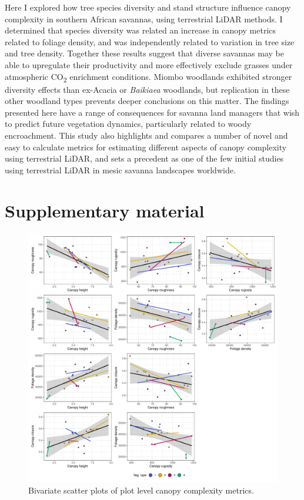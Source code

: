 \begin{refsection}
Here I explored how tree species diversity and stand structure influence canopy complexity in southern African savannas, using terrestrial LiDAR methods. I determined that species diversity was related an increase in canopy metrics related to foliage density, and was independently related to variation in tree size and tree density. Together these results suggest that diverse savannas may be able to upregulate their productivity and more effectively exclude grasses under atmospheric CO\textsubscript{2} enrichment conditions. Miombo woodlands exhibited stronger diversity effects than ex-Acacia or \textit{Baikiaea} woodlands, but replication in these other woodland types prevents deeper conclusions on this matter. The findings presented here have a range of consequences for savanna land managers that wish to predict future vegetation dynamics, particularly related to woody encroachment. This study also highlights and compares a number of novel and easy to calculate metrics for estimating different aspects of canopy complexity using terrestrial LiDAR, and sets a precedent as one of the few initial studies using terrestrial LiDAR in mesic savanna landscapes worldwide.

\newpage{}
\FloatBarrier{}
\begingroup
{}
\printbibliography[heading=subbibintoc]
\endgroup

\section{Supplementary material}
\label{tls:sec:supp}
\begin{supplement}

	\begin{figure}[H]
	\includegraphics[width=\linewidth]{img/canopy_metric_comp_plot}
	\caption[Bivariate plots of plot canopy complexity metrics]{Bivariate scatter plots of plot level canopy complexity metrics.}
	\label{tls:canopy_metric_comp_plot}
\end{figure}


\end{supplement}
\end{refsection}
